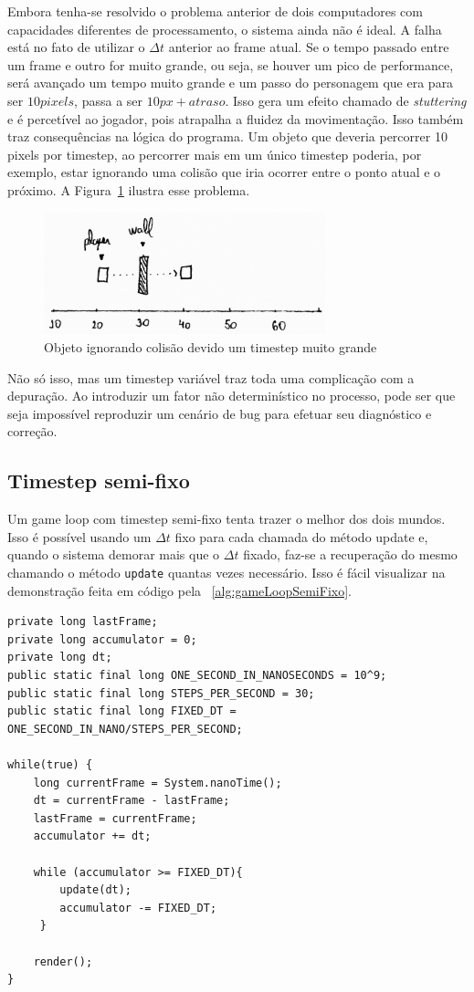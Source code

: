 \documentclass[12pt, 
openright, 
oneside, 
a4paper,    
brazil]{facom-ufu-abntex2}
\begin{document}
Embora tenha-se resolvido o problema anterior de dois computadores com capacidades diferentes de processamento, o sistema ainda não é ideal. A falha está no fato de utilizar o $\Delta t$ anterior ao frame atual. Se o tempo passado entre um frame e outro for muito grande, ou seja, se houver um pico de performance, será avançado um tempo muito grande e um passo do personagem que era para ser $10 pixels$, passa a ser $10px + atraso$. Isso gera um efeito chamado de \textit{stuttering} e é percetível ao jogador, pois atrapalha a fluidez da movimentação. Isso também traz consequências na lógica do programa. Um objeto que deveria percorrer 10 pixels por timestep, ao percorrer mais em um único timestep poderia, por exemplo, estar ignorando uma colisão que iria ocorrer entre o ponto atual e o próximo. A Figura~\ref{fig:ignoringCollision} ilustra esse problema.
\begin{figure}[H]
	\centering
	\includegraphics[width=22em]{imagens/ilu4_small.png}
	\caption{Objeto ignorando colisão devido um timestep muito grande}
	\label{fig:ignoringCollision}
\end{figure}
 Não só isso, mas um timestep variável traz toda uma complicação com a depuração. Ao introduzir um fator não determinístico no processo, pode ser que seja impossível reproduzir um cenário de bug para efetuar seu diagnóstico e correção. 

\subsection{Timestep semi-fixo}
Um game loop com timestep semi-fixo tenta trazer o melhor dos dois mundos. Isso é possível usando um $\Delta t$ fixo para cada chamada do método update e, quando o sistema demorar mais que o $\Delta t$ fixado, faz-se a recuperação do mesmo chamando o método \texttt{update} quantas vezes necessário.
Isso é fácil visualizar na demonstração feita em código pela \lstlistingname~\ref{alg:gameLoopSemiFixo}.

\begin{lstlisting}[caption={Game Loop com timestep semi-fixo}, label={alg:gameLoopSemiFixo}]
private long lastFrame;
private long accumulator = 0;
private long dt;
public static final long ONE_SECOND_IN_NANOSECONDS = 10^9;
public static final long STEPS_PER_SECOND = 30;
public static final long FIXED_DT = ONE_SECOND_IN_NANO/STEPS_PER_SECOND;
			
while(true) {
	long currentFrame = System.nanoTime(); 
	dt = currentFrame - lastFrame;
	lastFrame = currentFrame;
	accumulator += dt;
	
	while (accumulator >= FIXED_DT){
    	update(dt);
    	accumulator -= FIXED_DT;
 	 }
 			 
	render();
}
\end{lstlisting}
\end{document}
